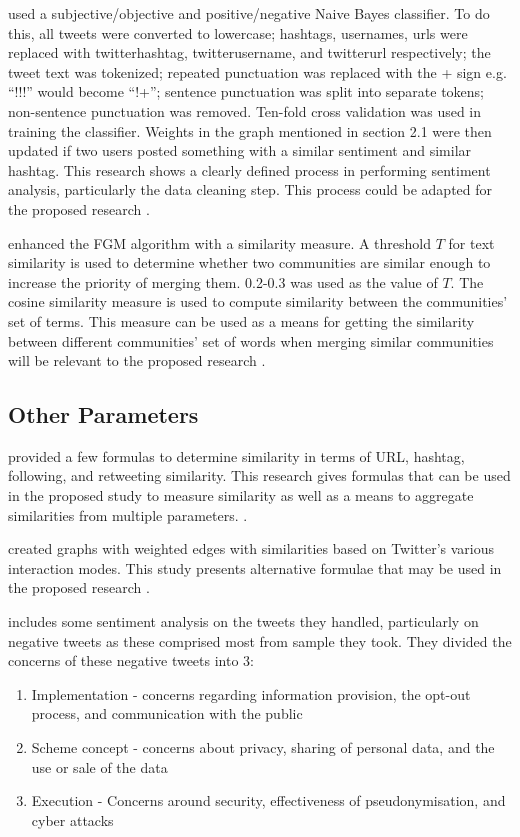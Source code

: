  used a subjective/objective and positive/negative Naive Bayes classifier. To do this, all tweets were converted to lowercase; hashtags, usernames, urls were replaced with twitterhashtag, twitterusername, and twitterurl respectively; the tweet text was tokenized; repeated punctuation was replaced with the + sign e.g. ``!!!'' would become ``!+''; sentence punctuation was split into separate tokens; non-sentence punctuation was removed. Ten-fold cross validation was used in training the classifier. Weights in the graph mentioned in section 2.1 were then updated if two users posted something with a similar sentiment and similar hashtag. This research shows a clearly defined process in performing sentiment analysis, particularly the data cleaning step. This process could be adapted for the proposed research \cite{Deitrick:2013}.

 enhanced the FGM algorithm with a similarity measure. A threshold $T$ for text similarity is used to determine whether two communities are similar enough to increase the priority of merging them. 0.2-0.3 was used as the value of $T$. The cosine similarity measure is used to compute similarity between the communities' set of terms. This measure can be used as a means for getting the similarity between different communities’ set of words when merging similar communities will be relevant to the proposed research \cite{Bakillah:2014}.

\subsection{Other Parameters}
 provided a few formulas to determine similarity in terms of URL, hashtag, following, and retweeting similarity. This research gives formulas that can be used in the proposed study to measure similarity as well as a means to aggregate similarities from multiple parameters. \cite{Zhang:2012}. 

 created graphs with weighted edges with similarities based on Twitter's various interaction modes. This study presents alternative formulae that may be used in the proposed research \cite{Bakillah:2014}.

 includes some sentiment analysis on the tweets they handled, particularly on negative tweets as these comprised most from sample they took. They divided the concerns of these negative tweets into 3:

\begin{enumerate}
	\item Implementation - concerns regarding information provision, the opt-out process, and communication with the public
	\item Scheme concept - concerns about privacy, sharing of personal data, and the use or sale of the data
	\item Execution - Concerns around security, effectiveness of pseudonymisation, and cyber attacks
	
\end{enumerate}

